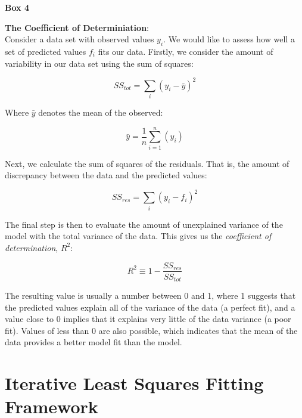 \newpage
\begin{framed}
{\begin{center}{\bf Box 4}\end{center}}
{\bf The Coefficient of Determiniation}:\\

Consider a data set with observed values $y_i$. We would like to assess how
well a set of predicted values $f_i$ fits our data. Firstly, we
consider the amount of variability in our data set using the sum of
squares:

\begin{equation}
  SS_{tot} = \sum\limits_{i}(y_i - \bar{y})^2
\end{equation}

Where $\bar{y}$ denotes the mean of the observed:

\begin{equation}
  \bar{y} = \frac{1}{n}\sum\limits_{i=1}^n(y_i)
\end{equation}

Next, we calculate the sum of squares of the residuals. That is, the
amount of discrepancy between the data and the predicted values:

\begin{equation}
SS_{res} = \sum\limits_{i}(y_i - f_i)^2
\end{equation}

The final step is then to evaluate the amount of unexplained variance of
the model with the total variance of the data. This gives us the
\emph{coefficient of determination}, $R^2$:

\begin{equation}
  R^2 \equiv 1 - \frac{SS_{res}}{SS_{tot}}
\end{equation}

The resulting value is usually a number between 0 and 1, where 1
suggests that the predicted values explain all of the variance of the
data (a perfect fit), and a value close to 0 implies that it explains
very little of the data
variance (a poor fit). Values of less than 0 are also possible, which indicates
that the mean of the data provides a better model fit than the model.

\end{framed}

\section{Iterative Least Squares Fitting Framework}

